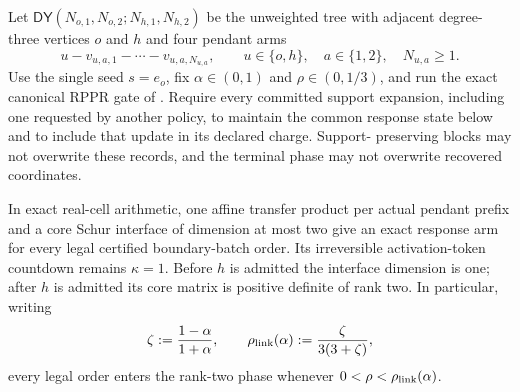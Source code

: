 \begin{theorem}
\label{thm:double-y-two-core-token-countdown}
Let $\mathsf{DY}(N_{o,1},N_{o,2};N_{h,1},N_{h,2})$ be the unweighted tree
with adjacent degree-three vertices $o$ and $h$ and four pendant arms
\begin{equation*}
 u-v_{u,a,1}-\cdots-v_{u,a,N_{u,a}},
 \qquad u\in\{o,h\},\quad a\in\{1,2\},\quad N_{u,a}\geq1.
\end{equation*}
Use the single seed $s=e_o$, fix $\alpha\in(0,1)$ and
$\rho\in(0,1/3)$, and run the exact canonical RPPR gate of
.  Require every committed support expansion,
including one requested by another policy, to maintain the common response
state below and to include that update in its declared charge.  Support-
preserving blocks may not overwrite these records, and the terminal phase may
not overwrite recovered coordinates.

In exact real-cell arithmetic, one affine transfer product per actual pendant
prefix and a core Schur interface of dimension at most two give an exact
response arm for every legal certified boundary-batch order.  Its irreversible
activation-token countdown remains $\kappa=1$.  Before $h$ is admitted the
interface dimension is one; after $h$ is admitted its core matrix is positive
definite of rank two.  In particular, writing
\begin{equation}
 \zeta:=\frac{1-\alpha}{1+\alpha},
 \qquad
 \rho_{\rm link}(\alpha):=\frac{\zeta}{3(3+\zeta)},
 \label{eq:double-y-link-threshold}
\end{equation}
every legal order enters the rank-two phase whenever
$0<\rho<\rho_{\rm link}(\alpha)$.


\end{theorem}
